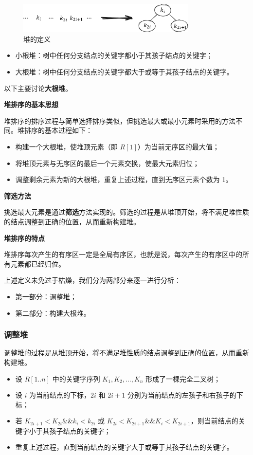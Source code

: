 \documentclass[lang=cn,newtx,10pt,scheme=chinese]{../elegantbook}
\begin{document}
\begin{figure}[!htbp]
    \centering
    \includegraphics[width=0.8\textwidth]{./figure/pdf/cropped/heap.pdf}
    \caption{堆的定义}
    \label{fig:heap}
\end{figure}
\begin{itemize}
  \item 小根堆：树中任何分支结点的关键字都小于其孩子结点的关键字；
  \item 大根堆：树中任何分支结点的关键字都大于或等于其孩子结点的关键字。
\end{itemize}

以下主要讨论\textbf{大根堆}。


\textbf{堆排序的基本思想}  

堆排序的排序过程与简单选择排序类似，但挑选最大或最小元素时采用的方法不同。堆排序的基本过程如下：
\begin{itemize}
  \item 构建一个大根堆，使堆顶元素（即 $R[1]$）为当前无序区的最大值；
  \item 将堆顶元素与无序区的最后一个元素交换，使最大元素归位；
  \item 调整剩余元素为新的大根堆，重复上述过程，直到无序区元素个数为 1。
\end{itemize}


\textbf{筛选方法}  

挑选最大元素是通过\textbf{筛选}方法实现的。筛选的过程是从堆顶开始，将不满足堆性质的结点调整到正确的位置，从而重新构建堆。


\textbf{堆排序的特点} 

堆排序每次产生的有序区一定是全局有序区，也就是说，每次产生的有序区中的所有元素都已经归位。

上述定义未免过于枯燥，我们分为两部分来逐一进行分析：
\begin{itemize}
  \item 第一部分：调整堆；
  \item 第二部分：构建大根堆。
  \end{itemize}
\subsubsection{调整堆}

调整堆的过程是从堆顶开始，将不满足堆性质的结点调整到正确的位置，从而重新构建堆。
\begin{itemize}
  \item 设 $R[1..n]$ 中的关键字序列 $K_1, K_2, \dots, K_n$ 形成了一棵完全二叉树；
  \item 设 $i$ 为当前结点的下标，$2i$ 和 $2i+1$ 分别为当前结点的左孩子和右孩子的下标；
  \item 若 $K_{2i+1} < K_{2i} \&\& k_i < k_{2i}$ 或 $K_{2i} < K_{2i+1} \&\& K_i < K_{2i+1}$，则当前结点的关键字小于其孩子结点的关键字；
  \item 重复上述过程，直到当前结点的关键字大于或等于其孩子结点的关键字。
\end{itemize}
\end{document}
